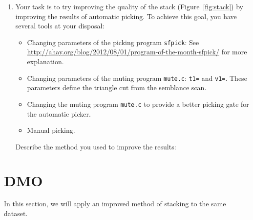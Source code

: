 \begin{enumerate}

\item Your task is to try improving the quality of the stack (Figure~\ref{fig:stack}) by improving the results of automatic picking. To achieve this goal, you have several tools at your disposal:
\begin{itemize}
\item Changing parameters of the picking program \texttt{sfpick}: See \url{http://ahay.org/blog/2012/08/01/program-of-the-month-sfpick/} for more explanation.
\item Changing parameters of the muting program \texttt{mute.c}: \texttt{t1=} and \texttt{v1=}. These parameters define the triangle cut from the semblance scan.
\item Changing the muting program \texttt{mute.c} to provide a better picking gate for the automatic picker.
\item Manual picking.
\end{itemize}

Describe the method you used to improve the results:

\answer{
}

\end{enumerate}

\lstset{language=c,numbers=left,numberstyle=\tiny,showstringspaces=false}


\lstset{language=python,numbers=left,numberstyle=\tiny,showstringspaces=false}


\section{DMO}

In this section, we will apply an improved method of stacking
\cite[]{Fowler.sepphd.58} to the same dataset.

